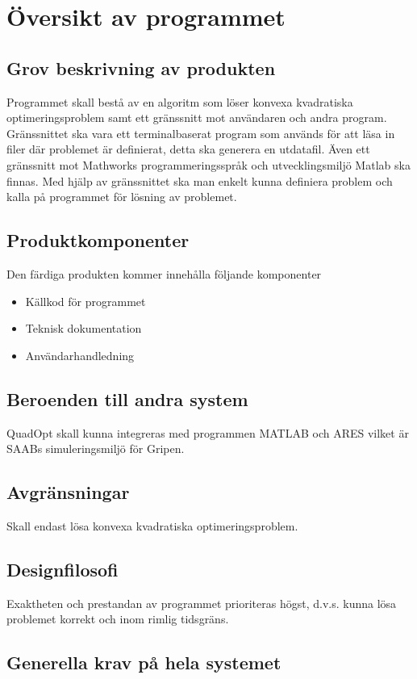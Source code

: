 \section{Översikt av programmet}

\subsection{Grov beskrivning av produkten}
Programmet skall bestå av en algoritm som löser konvexa kvadratiska optimeringsproblem samt ett gränssnitt mot användaren och andra program. Gränssnittet ska vara ett terminalbaserat program som används för att läsa in filer där problemet är definierat, detta ska generera en utdatafil. Även ett gränssnitt mot Mathworks programmeringsspråk och utvecklingsmiljö Matlab ska finnas. Med hjälp av gränssnittet ska man enkelt kunna definiera problem och kalla på programmet för lösning av problemet.    

\subsection{Produktkomponenter}
Den färdiga produkten kommer innehålla följande komponenter
\begin{itemize}
\item{Källkod för programmet}
\item{Teknisk dokumentation}
\item{Användarhandledning}
\end{itemize}

\subsection{Beroenden till andra system}
QuadOpt skall kunna integreras med programmen MATLAB och ARES vilket är SAABs simuleringsmiljö för Gripen.

\subsection{Avgränsningar}
Skall endast lösa konvexa kvadratiska optimeringsproblem. 

\subsection{Designfilosofi}
Exaktheten och prestandan av programmet prioriteras högst, d.v.s. kunna lösa problemet korrekt och inom rimlig tidsgräns. 

\subsection{Generella krav på hela systemet}

